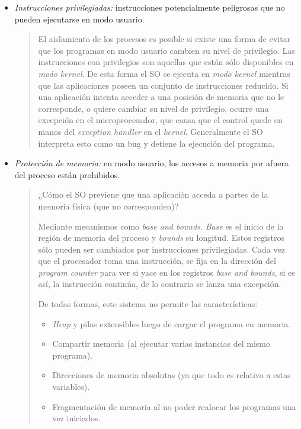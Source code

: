 \documentclass[a4paper,10pt,spanish]{article}
\begin{document}
\begin{itemize}
\item \textit{Instrucciones privilegiadas:} instrucciones potencialmente peligrosas que no pueden ejecutarse en modo usuario.

\begin{quote}
El aislamiento de los procesos es posible si existe una forma de evitar que los programas en modo usuario cambien su nivel de privilegio. Las instrucciones con privilegios son aquellas que están sólo disponibles en \textit{modo kernel}. De esta forma el SO se ejecuta en \textit{modo kernel} mientras que las aplicaciones poseen un conjunto de instrucciones reducido. Si una aplicación intenta acceder a una posición de memoria que no le corresponde, o quiere cambiar su nivel de privilegio, ocurre una excepción en el microprocesador, que causa que el control quede en manos del \textit{exception handler} en el \textit{kernel}. Generalmente el SO interpreta esto como un bug y detiene la ejecución del programa.
\end{quote}

\item \textit{Protección de memoria:} en modo usuario, los accesos a memoria por afuera del proceso están prohibidos.

\begin{quote}
¿Cómo el SO previene que una aplicación acceda a partes de la memoria física (que no corresponden)?

Mediante mecanismos como \textit{base and bounds}. \textit{Base} es el inicio de la región de memoria del proceso y \textit{bounds} su longitud. Estos registros sólo pueden ser cambiados por instrucciones privilegiadas. Cada vez que el procesador toma una instrucción, se fija en la dirección del \textit{program counter} para ver si yace en los registros \textit{base and bounds}, si es así, la instrucción continúa, de lo contrario se lanza una excepción.

De todas formas, este sistema no permite las características:

\begin{itemize}
\item \textit{Heap} y pilas extensibles luego de cargar el programa en memoria.
\item Compartir memoria (al ejecutar varias instancias del mismo programa).
\item Direcciones de memoria absolutas (ya que todo es relativo a estas variables).
\item Fragmentación de memoria al no poder realocar los programas una vez iniciados.
\end{itemize}


\end{quote}
\end{itemize}
\end{document}
